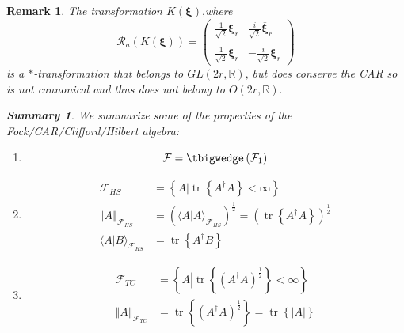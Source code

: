 \documentclass[aps, preprint]{revtex4}
\newtheorem{remark}[theorem]{Remark}
\newtheorem{summary}[theorem]{Summary}
\begin{document}
\begin{remark}
The transformation $K \left (\mathbf{\xi }\right )\text{,}$where
\begin{equation}\mathcal{R}_{a} \left (K \left (\mathbf{\xi }\right )\right ) =\left (\begin{array}{cc}\frac{1}{\sqrt{2}} \mathbf{\xi }_{r} & \frac{i}{\sqrt{2}} \overline{\mathbf{\xi }}_{r} \\
\frac{1}{\sqrt{2}} \overline{\mathbf{\xi }_{r}} &  -\frac{i}{\sqrt{2}} \overline{\overline{\mathbf{\xi }}_{r}}\end{array}\right )
\end{equation}is a $ \ast $-transformation that belongs to $G L \left (2 r ,\mathbb{R}\right )\text{,}$ but does conserve the CAR so is not cannonical and thus does not belong to $O \left (2 r ,\mathbb{R}\right )\text{.}$ 


\begin{summary}
We summarize some of the properties of the Fock/CAR/Clifford/Hilbert algebra: 


\begin{enumerate}
\item
\begin{equation}\mathcal{F} = \tbigwedge \left (\mathcal{F}_{1}\right )
\end{equation}

\item
\begin{align}\mathcal{F}_{H S} &  =\left \{\left .A\right \vert \ensuremath{\operatorname*{tr}}\left \{A^{ \dag } A\right \} <\infty \right \} \\
\left \Vert A\right \Vert _{\mathcal{F}_{H S}} &  =\left ( \langle \left .A\right \vert A \rangle _{\mathcal{F}_{H S}}\right )^{\frac{1}{2}} =\left (\ensuremath{\operatorname*{tr}}\left \{A^{ \dag } A\right \}\right )^{\frac{1}{2}} \\
 \langle \left .A\right \vert B \rangle _{\mathcal{F}_{H S}} &  =\ensuremath{\operatorname*{tr}}\left \{A^{ \dag } B\right \}\end{align}

\item
\begin{align}\mathcal{F}_{T C} &  =\left \{\left .\overset{}{A}\right \vert \ensuremath{\operatorname*{tr}}\left \{\left (A^{ \dag } A\right )^{\frac{1}{2}}\right \} <\infty \right \} \\
\left \Vert A\right \Vert _{\mathcal{F}_{T C}} &  =\ensuremath{\operatorname*{tr}}\left \{\left (A^{ \dag } A\right )^{\frac{1}{2}}\right \} =\ensuremath{\operatorname*{tr}}\left \{\left \vert A\right \vert \right \}\end{align}


\end{enumerate}
\end{summary}
\end{remark}
\end{document}
